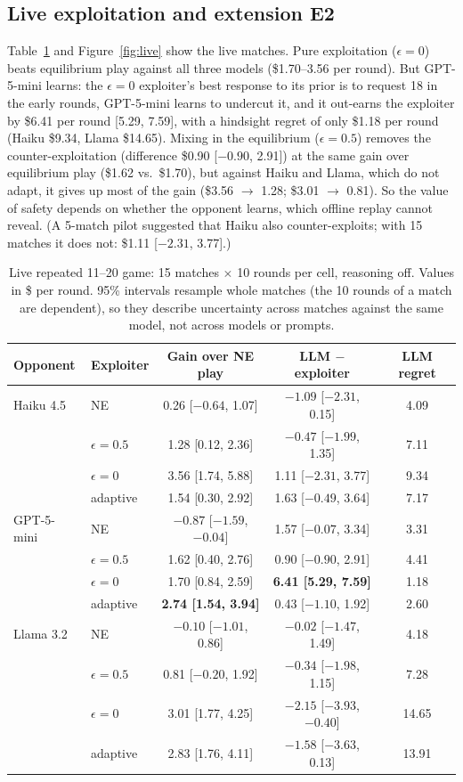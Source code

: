 \documentclass[11pt]{article}
\begin{document}
\subsection{Live exploitation and extension E2}\label{sec:live}
Table~\ref{tab:live} and Figure~\ref{fig:live} show the live matches. Pure exploitation ($\epsilon=0$) beats equilibrium play against all three models (\$1.70--3.56 per round). But GPT-5-mini learns: the $\epsilon=0$ exploiter's best response to its prior is to request 18 in the early rounds, GPT-5-mini learns to undercut it, and it out-earns the exploiter by \$6.41 per round [5.29, 7.59], with a hindsight regret of only \$1.18 per round (Haiku \$9.34, Llama \$14.65). Mixing in the equilibrium ($\epsilon=0.5$) removes the counter-exploitation (difference \$0.90 [$-0.90$, 2.91]) at the same gain over equilibrium play (\$1.62 vs.\ \$1.70), but against Haiku and Llama, which do not adapt, it gives up most of the gain (\$3.56 $\to$ 1.28; \$3.01 $\to$ 0.81). So the value of safety depends on whether the opponent learns, which offline replay cannot reveal. (A 5-match pilot suggested that Haiku also counter-exploits; with 15 matches it does not: \$1.11 [$-2.31$, 3.77].)

\begin{table}[t]
\centering\small
\caption{Live repeated 11--20 game: 15 matches $\times$ 10 rounds per cell, reasoning off. Values in \$ per round. 95\% intervals resample whole matches (the 10 rounds of a match are dependent), so they describe uncertainty across matches against the same model, not across models or prompts.}\label{tab:live}
\begin{tabular}{@{}llccc@{}}
\toprule
Opponent & Exploiter & Gain over NE play & LLM $-$ exploiter & LLM regret\\
\midrule
Haiku 4.5 & NE & 0.26 [$-0.64$, 1.07] & $-1.09$ [$-2.31$, 0.15] & 4.09\\
& $\epsilon=0.5$ & 1.28 [0.12, 2.36] & $-0.47$ [$-1.99$, 1.35] & 7.11\\
& $\epsilon=0$ & 3.56 [1.74, 5.88] & 1.11 [$-2.31$, 3.77] & 9.34\\
& adaptive & 1.54 [0.30, 2.92] & 1.63 [$-0.49$, 3.64] & 7.17\\
\midrule
GPT-5-mini & NE & $-0.87$ [$-1.59$, $-0.04$] & 1.57 [$-0.07$, 3.34] & 3.31\\
& $\epsilon=0.5$ & 1.62 [0.40, 2.76] & 0.90 [$-0.90$, 2.91] & 4.41\\
& $\epsilon=0$ & 1.70 [0.84, 2.59] & \textbf{6.41 [5.29, 7.59]} & 1.18\\
& adaptive & \textbf{2.74 [1.54, 3.94]} & 0.43 [$-1.10$, 1.92] & 2.60\\
\midrule
Llama 3.2 & NE & $-0.10$ [$-1.01$, 0.86] & $-0.02$ [$-1.47$, 1.49] & 4.18\\
& $\epsilon=0.5$ & 0.81 [$-0.20$, 1.92] & $-0.34$ [$-1.98$, 1.15] & 7.28\\
& $\epsilon=0$ & 3.01 [1.77, 4.25] & $-2.15$ [$-3.93$, $-0.40$] & 14.65\\
& adaptive & 2.83 [1.76, 4.11] & $-1.58$ [$-3.63$, 0.13] & 13.91\\
\bottomrule
\end{tabular}
\end{table}
\end{document}
